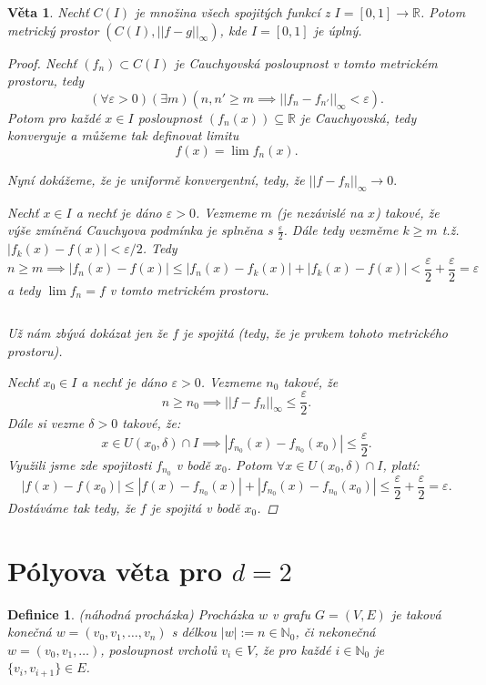 \documentclass[10pt,a4paper]{article}
\newcommand{\R}{{\mathbb{R}}}       %
\newcommand{\N}{{\mathbb{N}}}       %
\newtheorem*{thm}{Věta}
\newtheorem{Def}{Definice}[section]
\begin{document}
\begin{thm} Nechť $C(I)$ je množina všech spojitých funkcí z $I=[0,1] \to \R$. Potom metrický prostor $ (C(I) , || f-g ||_{\infty}) $, kde $I=[0,1]$ je úplný. \normalfont
	\begin{proof}
		Nechť $(f_n) \subset C(I)$ je Cauchyovská posloupnost v tomto metrickém prostoru, tedy
		\[
		(\forall \varepsilon >0) (\exists m) (n, n' \geq m \implies ||f_n - f_{n'}||_{\infty} < \varepsilon).
		\]
		Potom pro každé $x \in I$ posloupnost $(f_n(x))\subseteq \R$ je Cauchyovská, tedy konverguje a můžeme tak definovat limitu $$f(x) = \lim f_n(x).$$
		
		Nyní dokážeme, že je uniformě konvergentní, tedy, že $||f - f_n||_{\infty} \to 0.$
		
		Nechť $x \in I$ a nechť je dáno $\varepsilon > 0$. Vezmeme $m$ (je nezávislé na $x$) takové, že výše zmíněná Cauchyova podmínka je splněna s $\frac{\varepsilon}2$. 
		Dále tedy vezměme $k \geq m$ t.ž. $|f_k (x) - f (x)| < \varepsilon/2$. 
		Tedy 
		\[
		n \geq m \implies |f_n(x) - f (x)| \leq |f_n (x)- f_k(x)| + |f_k(x) - f(x)|< \frac{\varepsilon}2 + \frac{\varepsilon}2 = \varepsilon
		\] a tedy $\lim f_n = f$ v tomto metrickém prostoru.
		
		$ $
		
		Už nám zbývá dokázat jen že $f$ je spojitá (tedy, že je prvkem tohoto metrického prostoru).
		
		Nechť $x_0 \in I$ a nechť je dáno $\varepsilon > 0$. Vezmeme $n_0$ takové, že 
		\[
			n \geq n_0 \implies ||f - f_n ||_{\infty} \leq \frac{\varepsilon}2 .
		\]
		Dále si vezme $\delta > 0$ takové, že:
		\[
			x \in U (x_0 , \delta) \cap I \implies |f_{n_0} (x) - f_{n_0} (x_0)| \leq \frac{\varepsilon}2.
		\]
		Využili jsme zde spojitosti $f_{n_0}$ v bodě $x_0$. 		
		Potom $\forall x \in U (x_0 , \delta) \cap I$, platí:
		\[
			|f (x) - f (x_0 )| \leq |f (x) - f_{n_0} (x)| + |f_{n_0} (x) - f_{n_0} (x_0 )| \leq \frac{\varepsilon}{2} + \frac{\varepsilon}{2} = \varepsilon.
		\]
		 Dostáváme tak tedy, že $ f $ je spojitá v bodě $x_0$.
	\end{proof}
\end{thm}

\section{Pólyova věta pro $ d=2 $}

\begin{Def} (náhodná procházka)
	Procházka \normalfont $ w $ v grafu $G = (V, E)$ je taková konečná $w = (v_0, v_1 , \ldots, v_n)$ s délkou $|w| := n\in \N_0$, či nekonečná $w = (v_0 , v_1 , \ldots )$, posloupnost vrcholů $v_i \in V$, že pro každé $i \in \N_0$ je $\{v_i, v_{i+1}\} \in E$.
\end{Def}
\end{document}
